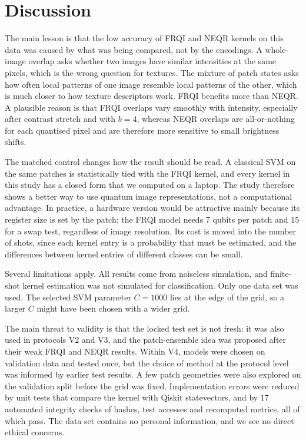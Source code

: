 \documentclass[12pt,onecolumn,draftclsnofoot]{IEEEtran}
\begin{document}
\section{Discussion}
The main lesson is that the low accuracy of FRQI and NEQR kernels on this data was caused by what was being compared, not by the encodings. A whole-image overlap asks whether two images have similar intensities at the same pixels, which is the wrong question for textures. The mixture of patch states asks how often local patterns of one image resemble local patterns of the other, which is much closer to how texture descriptors work. FRQI benefits more than NEQR. A plausible reason is that FRQI overlaps vary smoothly with intensity, especially after contrast stretch and with $b=4$, whereas NEQR overlaps are all-or-nothing for each quantised pixel and are therefore more sensitive to small brightness shifts.

The matched control changes how the result should be read. A classical SVM on the same patches is statistically tied with the FRQI kernel, and every kernel in this study has a closed form that we computed on a laptop. The study therefore shows a better way to use quantum image representations, not a computational advantage. In practice, a hardware version would be attractive mainly because its register size is set by the patch: the FRQI model needs 7 qubits per patch and 15 for a swap test, regardless of image resolution. Its cost is moved into the number of shots, since each kernel entry is a probability that must be estimated, and the differences between kernel entries of different classes can be small.

Several limitations apply. All results come from noiseless simulation, and finite-shot kernel estimation was not simulated for classification. Only one data set was used. The selected SVM parameter $C=1000$ lies at the edge of the grid, so a larger $C$ might have been chosen with a wider grid.

The main threat to validity is that the locked test set is not fresh: it was also used in protocols V2 and V3, and the patch-ensemble idea was proposed after their weak FRQI and NEQR results. Within V4, models were chosen on validation data and tested once, but the choice of method at the protocol level was informed by earlier test results. A few patch geometries were also explored on the validation split before the grid was fixed. Implementation errors were reduced by unit tests that compare the kernel with Qiskit statevectors, and by 17 automated integrity checks of hashes, test accesses and recomputed metrics, all of which pass. The data set contains no personal information, and we see no direct ethical concerns.
\end{document}
